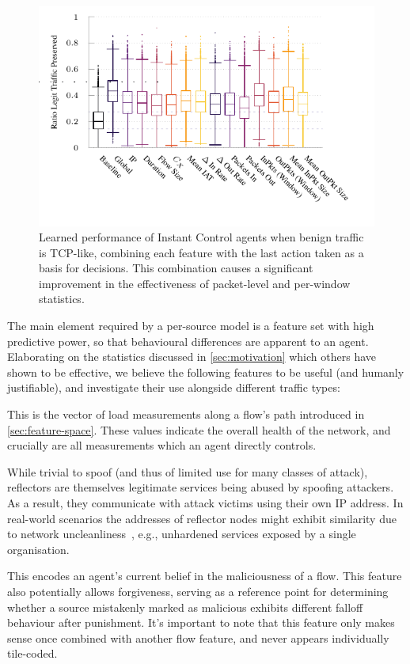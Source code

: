 \begin{figure}
	\centering
	\includegraphics[width=0.65\linewidth]{plots/marl/ftprep-tcp-laf-cap-box}
	\caption{
		Learned performance of Instant Control agents when benign traffic is TCP-like, combining each feature with the last action taken as a basis for decisions.
		This combination causes a significant improvement in the effectiveness of packet-level and per-window statistics.
		\label{fig:tcp-laf-feature-plots}
	}
\end{figure}

The main element required by a per-source model is a feature set with high predictive power, so that behavioural differences are apparent to an agent.
Elaborating on the statistics discussed in \cref{sec:motivation} which others have shown to be effective, we believe the following features to be useful (and humanly justifiable), and investigate their use alongside different traffic types:

This is the vector of load measurements along a flow's path introduced in \cref{sec:feature-space}.
These values indicate the overall health of the network, and crucially are all measurements which an agent directly controls.

While trivial to spoof (and thus of limited use for many classes of attack), reflectors are themselves legitimate services being abused by spoofing attackers.
As a result, they communicate with attack victims using their own IP address.
In real-world scenarios the addresses of reflector nodes might exhibit similarity due to network uncleanliness~\parencite{DBLP:conf/imc/CollinsSFJWSK07}, e.g., unhardened services exposed by a single organisation.

This encodes an agent's current belief in the maliciousness of a flow.
This feature also potentially allows forgiveness, serving as a reference point for determining whether a source mistakenly marked as malicious exhibits different falloff behaviour after punishment.
It's important to note that this feature only makes sense once combined with another flow feature, and never appears individually tile-coded.


